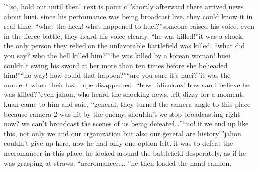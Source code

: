 ”“so, hold out until then! next is point c!”shortly afterward there arrived news about huei.
 since his performance was being broadcast live, they could know it in real-time.
“what the heck! what happened to huei?”someone raised his voice.
 even in the fierce battle, they heard his voice clearly.
“he was killed!”it was a shock.
 the only person they relied on the unfavorable battlefield was killed.
“what did you say? who the hell killed him?”“he was killed by a korean woman! huei couldn’t swing his sword at her more than ten times before she beheaded him!”“no way! how could that happen?”“are you sure it’s huei?”it was the moment when their last hope disappeared.
“how ridiculous! how can i believe he was killed?”even jahon, who heard the shocking news, felt dizzy for a moment.
kuan came to him and said, “general, they turned the camera angle to this place because camera 2 was hit by the enemy.
 shouldn’t we stop broadcasting right now? we can’t broadcast the scenes of us being defeated…”“no! if we end up like this, not only we and our organization but also our general are history!”jahon couldn’t give up here.
 now he had only one option left.
 it was to defeat the necromancer in this place.
 he looked around the battlefield desperately, as if he was grasping at straws.
“necromancer….
”he then loaded the hand cannon.

